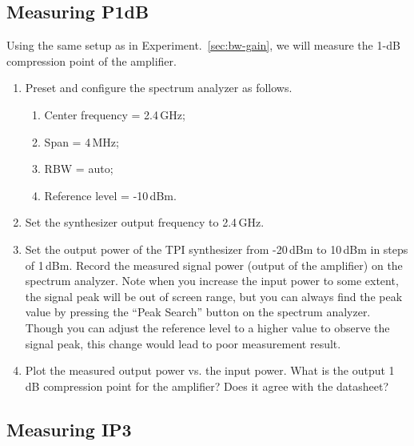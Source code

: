 \documentclass[letterpaper, 11pt]{article}
\begin{document}
\subsection{Measuring P1dB}
\label{sec:p1db}

Using the same setup as in Experiment.~\ref{sec:bw-gain}, we will measure the 1-dB compression point of the amplifier. 

\begin{enumerate}
	\item Preset and configure the spectrum analyzer as follows.
		\begin{enumerate}
			\item Center frequency = 2.4\,GHz;
			\item Span = 4\,MHz;
			\item RBW = auto;
			\item Reference level = -10\,dBm.
		\end{enumerate}
		
	\item Set the synthesizer output frequency to 2.4\,GHz.
	
	\item Set the output power of the TPI synthesizer from -20\,dBm to 10\,dBm in steps of 1\,dBm. Record the measured signal power (output of the amplifier) on the spectrum analyzer. Note when you increase the input power to some extent, the signal peak will be out of screen range, but you can always find the peak value by pressing the ``Peak Search'' button on the spectrum analyzer. Though you can adjust the reference level to a higher value to observe the signal peak, this change would lead to poor measurement result.
	
	\item Plot the measured output power vs. the input power. What is the output 1\,dB compression point for the amplifier? Does it agree with the datasheet?
\end{enumerate}

\subsection{Measuring IP3}
\label{sec:ip3}
\end{document}
